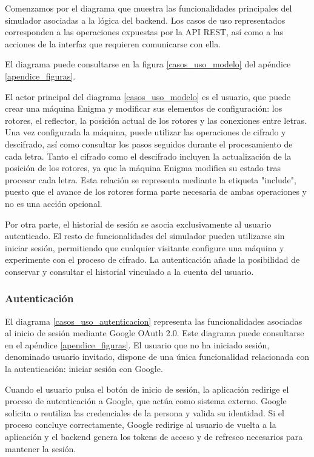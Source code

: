 Comenzamos por el diagrama que muestra las funcionalidades principales del simulador asociadas a la lógica del backend. Los casos de uso representados corresponden a las operaciones expuestas por la API REST, así como a las acciones de la interfaz que requieren comunicarse con ella.

El diagrama puede consultarse en la figura \ref{casos_uso_modelo} del apéndice \ref{apendice_figuras}.

El actor principal del diagrama \ref{casos_uso_modelo} es el usuario, que puede crear una máquina Enigma y modificar sus elementos de configuración: los rotores, el reflector, la posición actual de los rotores y las conexiones entre letras. Una vez configurada la máquina, puede utilizar las operaciones de cifrado y descifrado, así como consultar los pasos seguidos durante el procesamiento de cada letra.
Tanto el cifrado como el descifrado incluyen la actualización de la posición de los rotores, ya que la máquina Enigma modifica su estado tras procesar cada letra. Esta relación se representa mediante la etiqueta "include", puesto que el avance de los rotores forma parte necesaria de ambas operaciones y no es una acción opcional.

Por otra parte, el historial de sesión se asocia exclusivamente al usuario autenticado. El resto de funcionalidades del simulador pueden utilizarse sin iniciar sesión, permitiendo que cualquier visitante configure una máquina y experimente con el proceso de cifrado. La autenticación añade la posibilidad de conservar y consultar el historial vinculado a la cuenta del usuario.

\subsubsection{Autenticación}

El diagrama \ref{casos_uso_autenticacion} representa las funcionalidades asociadas al inicio de sesión mediante Google OAuth 2.0.
Este diagrama puede consultarse en el apéndice \ref{apendice_figuras}.
El usuario que no ha iniciado sesión, denominado usuario invitado, dispone de una única funcionalidad relacionada con la autenticación: iniciar sesión con Google.

Cuando el usuario pulsa el botón de inicio de sesión, la aplicación redirige el proceso de autenticación a Google, que actúa como sistema externo. Google solicita o reutiliza las credenciales de la persona y valida su identidad. Si el proceso concluye correctamente, Google redirige al usuario de vuelta a la aplicación y el backend genera los tokens de acceso y de refresco necesarios para mantener la sesión.


